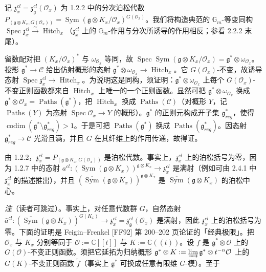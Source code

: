 
记 $\mathfrak{z}_x^{cl}=\mathfrak{z}_{\mathfrak{g}}^{cl}(\mathcal{O}_x)$ 为 1.2.2 中的分次泊松代数 $P_{(\mathfrak{g}\otimes K_x,G(\mathcal{O}_x))}=\operatorname{Sym}(\mathfrak{g}\otimes K_x/\mathcal{O}_x)^{G(\mathcal{O}_x)}$。我们将构造典范的 $\mathbb{G}_m$-等变同构 $\operatorname{Spec}\mathfrak{z}_x^{cl}\xrightarrow{\sim}\operatorname{Hitch}_x$（$\mathfrak{z}_x^{cl}$ 上的 $\mathbb{G}_m$-作用与分次所诱导的作用相反；参看 2.2.2 末尾）。

留数配对把 $(K_x/\mathcal{O}_x)^{*}$ 与 $\omega_{\mathcal{O}_x}$ 等同，故 $\operatorname{Spec}\operatorname{Sym}(\mathfrak{g}\otimes K_x/\mathcal{O}_x)=\mathfrak{g}^{*}\otimes\omega_{\mathcal{O}_x}$。投影 $\mathfrak{g}^{*}\to\mathcal{C}$ 给出仿射概形的态射 $\mathfrak{g}^{*}\otimes\omega_{\mathcal{O}_x}\to\operatorname{Hitch}_x$。它 $G(\mathcal{O}_x)$-不变，故诱导态射 $\operatorname{Spec}\mathfrak{z}_x^{cl}\to\operatorname{Hitch}_x$。为说明这是同构，须证明：$\mathfrak{g}^{*}\otimes\omega_{\mathcal{O}_x}$ 上每个 $G(\mathcal{O}_x)$-不变正则函数都来自 $\operatorname{Hitch}_x$ 上唯一的一个正则函数。显然可把 $\mathfrak{g}^{*}\otimes\omega_{\mathcal{O}_x}$ 换成 $\mathfrak{g}^{*}\otimes\mathcal{O}_x=\operatorname{Paths}(\mathfrak{g}^{*})$，把 $\operatorname{Hitch}_x$ 换成 $\operatorname{Paths}(\mathcal{C})$（对概形 $Y$，记 $\operatorname{Paths}(Y)$ 为态射 $\operatorname{Spec}\mathcal{O}_x\to Y$ 的概形）。$\mathfrak{g}^{*}$ 的正则元构成开子集 $\mathfrak{g}^{*}_{reg}$，使得 $\operatorname{codim}(\mathfrak{g}^{*}\setminus\mathfrak{g}^{*}_{reg})>1$。于是可把 $\operatorname{Paths}(\mathfrak{g}^{*})$ 换成 $\operatorname{Paths}(\mathfrak{g}^{*}_{reg})$。因态射 $\mathfrak{g}^{*}_{reg}\to\mathcal{C}$ 光滑且满，并且 $G$ 在其纤维上的作用传递，故得证。

 由 1.2.2，$\mathfrak{z}_x^{cl}=P_{(\mathfrak{g}\otimes K_x,G(\mathcal{O}_x))}$ 是泊松代数。事实上，$\mathfrak{z}_x^{cl}$ 上的泊松括号为零，因为 1.2.7 中的态射 $a^{cl}:(\operatorname{Sym}(\mathfrak{g}\otimes K_x))^{\mathfrak{g}\otimes K_x}\to\mathfrak{z}_x^{cl}$ 是满射（例如可由 2.4.1 中 $\mathfrak{z}_x^{cl}$ 的描述推出），并且 $(\overline{\operatorname{Sym}}(\mathfrak{g}\otimes K_x))^{\mathfrak{g}\otimes K_x}$ 是 $\overline{\operatorname{Sym}}(\mathfrak{g}\otimes K_x)$ 的泊松中心。

\emph{注}（读者可跳过）。事实上，对任意代数群 $G$，自然态射 $\bar{a}^{cl}:(\overline{\operatorname{Sym}}(\mathfrak{g}\otimes K_x))^{G(K_x)}\to\mathfrak{z}_x^{cl}=\mathfrak{z}_{\mathfrak{g}}^{cl}(\mathcal{O}_x)$ 是满射，因此 $\mathfrak{z}_x^{cl}$ 上的泊松括号为零。下面的证明是 Feigin--Frenkel [FF92] 第 200--202 页论证的「经典极限」。把 $\mathcal{O}_x$ 与 $K_x$ 分别等同于 $\mathcal{O}:=\mathbb{C}[[t]]$ 与 $K:=\mathbb{C}((t))$。设 $f$ 是 $\mathfrak{g}^{*}\otimes\mathcal{O}$ 上的 $G(\mathcal{O})$-不变正则函数。须把它延拓为归纳概形 $\mathfrak{g}^{*}\otimes K:=\varinjlim\mathfrak{g}^{*}\otimes t^{-n}\mathcal{O}$ 上的 $G(K)$-不变正则函数 $\tilde{f}$（事实上 $\mathfrak{g}^{*}$ 可换成任意有限维 $G$-模）。至于

